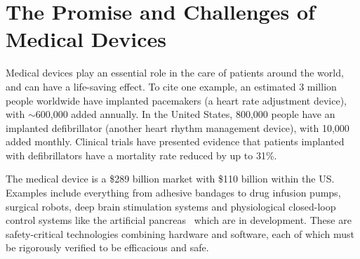 \section{The Promise and Challenges of Medical Devices}
Medical devices play an essential role in the care of patients around the world, and can have a life-saving effect.
To cite one example, 
an estimated 3 million people worldwide have implanted pacemakers (a heart rate adjustment device), with $\sim$600,000 added annually.
In the United States, 800,000 people have an implanted defibrillator (another heart rhythm management device), with 10,000 added monthly.
Clinical trials have presented evidence that patients implanted with defibrillators have a mortality rate reduced by up to 31\%.

The medical device is a \$289 billion market with \$110 billion within the US.
Examples include everything from adhesive bandages to drug infusion pumps, surgical robots, deep brain stimulation systems and physiological closed-loop control systems like the artificial pancreas~\cite{pancreas_paul} which are in development.
These are safety-critical technologies combining hardware and software, each of which must be rigorously verified to be efficacious and safe.

